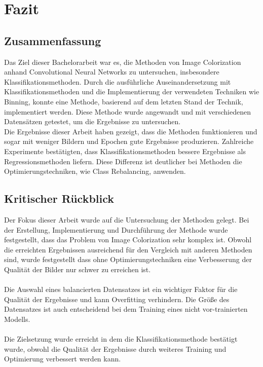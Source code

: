 \chapter{Fazit} 

\section{Zusammenfassung}
Das Ziel dieser Bachelorarbeit war es, die Methoden von Image Colorization anhand Convolutional Neural Networks zu untersuchen, insbesondere
Klassifikationsmethoden. Durch die ausführliche Auseinandersetzung mit Klassifikationsmethoden und die Implementierung der verwendeten Techniken
wie Binning, konnte eine Methode, basierend auf dem letzten Stand der Technik, implementiert werden. Diese Methode wurde angewandt und mit verschiedenen
Datensätzen getestet, um die Ergebnisse zu untersuchen.
\\
Die Ergebnisse dieser Arbeit haben gezeigt, dass die Methoden funktionieren und sogar mit weniger Bildern und Epochen gute Ergebnisse produzieren.
Zahlreiche Experimente bestätigten, dass Klassifikationsmethoden bessere Ergebnisse als Regressionsmethoden liefern. Diese Differenz ist deutlicher
bei Methoden die Optimierungstechniken, wie Class Rebalancing, anwenden.


\section{Kritischer Rückblick}
Der Fokus dieser Arbeit wurde auf die Untersuchung der Methoden gelegt. Bei der Erstellung, Implementierung und Durchführung der Methode wurde
festgestellt, dass das Problem von Image Colorization sehr komplex ist. Obwohl die erreichten Ergebnissen ausreichend für den Vergleich mit 
anderen Methoden sind, wurde festgestellt dass ohne Optimierungstechniken eine Verbesserung der Qualität der Bilder nur schwer zu erreichen ist.
\\
\\
Die Auswahl eines balancierten Datensatzes ist ein wichtiger Faktor für die Qualität der Ergebnisse und kann Overfitting verhindern. Die Größe 
des Datensatzes ist auch entscheidend bei dem Training eines nicht vor-trainierten Modells.
\\
\\
Die Zielsetzung wurde erreicht in dem die Klassifikationsmethode bestätigt wurde, obwohl die Qualität der Ergebnisse durch weiteres Training
und Optimierung verbessert werden kann.

